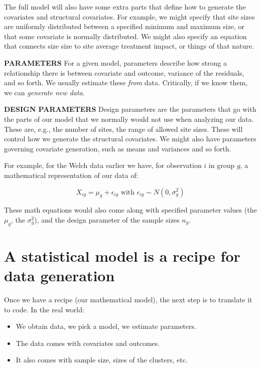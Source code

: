 \documentclass[
]{book}
\providecommand{\tightlist}{%
  \setlength{\itemsep}{0pt}\setlength{\parskip}{0pt}}
\begin{document}
The full model will also have some extra parts that define how to generate the covariates and structural covariates.
For example, we might specify that site sizes are uniformly distributed between a specified minimum and maximum size, or that some covariate is normally distributed.
We might also specify an equation that connects size size to site average treatment impact, or things of that nature.

\textbf{PARAMETERS}
For a given model, parameters describe how strong a relationship there is between covariate and outcome, variance of the residuals, and so forth.
We usually estimate these \emph{from} data.
Critically, if we know them, we can \emph{generate new data}.

\textbf{DESIGN PARAMETERS}
Design parameters are the parameters that go with the parts of our model that we normally would not use when analyzing our data.
These are, e.g., the number of sites, the range of allowed site sizes.
These will control how we generate the structural covariates.
We might also have parameters governing covariate generation, such as means and variances and so forth.

For example, for the Welch data earlier we have, for observation \(i\) in group \(g\), a mathematical representation of our data of:

\[ X_{ig} = \mu_g + \epsilon_{ig} \mbox{ with } \epsilon_{ig} \sim N( 0, \sigma^2_g ) \]

These math equations would also come along with specified parameter values (the \(\mu_g\), the \(\sigma^2_g\)), and the design parameter of the sample sizes \(n_g\).

\section{A statistical model is a recipe for data generation}\label{a-statistical-model-is-a-recipe-for-data-generation}

Once we have a recipe (our mathematical model), the next step is to translate it to code.
In the real world:

\begin{itemize}
\tightlist
\item
  We obtain data, we pick a model, we estimate parameters.
\item
  The data comes with covariates and outcomes.
\item
  It also comes with sample size, sizes of the clusters, etc.
\end{itemize}
\end{document}
